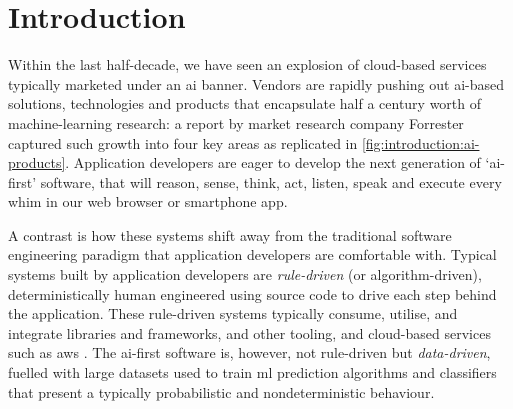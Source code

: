 \chapter{Introduction}
\label{ch:introduction}
\graphicspath{{mainmatter/introduction/figures/}}

Within the last half-decade, we have seen an explosion of cloud-based services typically marketed under an \gls{ai} banner. 
Vendors are rapidly pushing out \gls{ai}-based solutions, technologies and products that encapsulate half a century worth of machine-learning research: a \citeyear{LoGiudice:2016wf} report by market research company Forrester captured such growth into four key areas \citep{LoGiudice:2016wf} as replicated in  \cref{fig:introduction:ai-products}. 
Application developers are eager to develop the next generation of `\gls{ai}-first' software, that will reason, sense, think, act, listen, speak and execute every whim in our web browser or smartphone app.

A contrast is how these systems shift away from the traditional software engineering paradigm that application developers are comfortable with. Typical systems built by application developers are \textit{rule-driven} (or algorithm-driven), deterministically human engineered using source code to drive each step behind the application. These rule-driven systems typically consume, utilise, and integrate libraries and frameworks,  and other tooling, and cloud-based services such as \gls{aws} \citep{AWS:Home}. The \gls{ai}-first software is, however, not rule-driven but \textit{data-driven}, fuelled with large datasets used to train \gls{ml} prediction algorithms and classifiers that present a typically probabilistic and nondeterministic behaviour.


